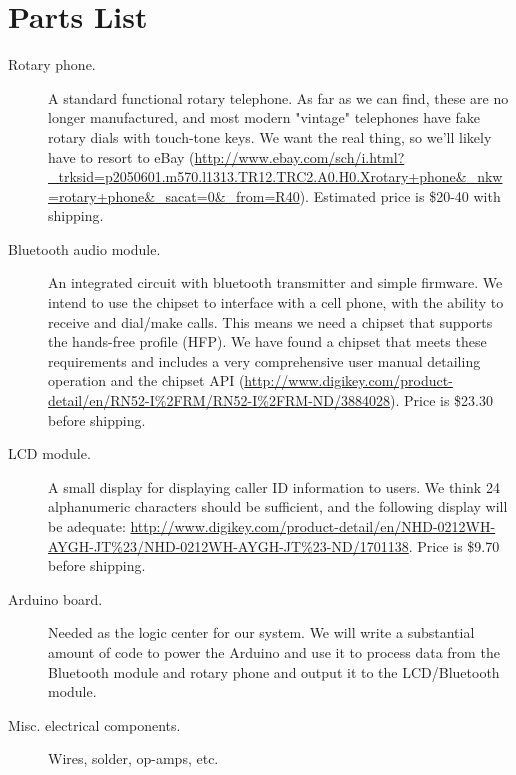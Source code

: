 \documentclass[11pt]{article}
\begin{document}
    \section{Parts List}
        \begin{description}
            \item[Rotary phone.] A standard functional rotary telephone. As far as we can find, these are no longer manufactured, and most modern "vintage" telephones have fake rotary dials with touch-tone keys. We want the real thing, so we'll likely have to resort to eBay (\url{http://www.ebay.com/sch/i.html?_trksid=p2050601.m570.l1313.TR12.TRC2.A0.H0.Xrotary+phone&_nkw=rotary+phone&_sacat=0&_from=R40}). Estimated price is \$20-40 with shipping.
            \item[Bluetooth audio module.] An integrated circuit with bluetooth transmitter and simple firmware. We intend to use the chipset to interface with a cell phone, with the ability to receive and dial/make calls. This means we need a chipset that supports the hands-free profile (HFP). We have found a chipset that meets these requirements and includes a very comprehensive user manual detailing operation and the chipset API (\url{http://www.digikey.com/product-detail/en/RN52-I%2FRM/RN52-I%2FRM-ND/3884028}). Price is \$23.30 before shipping.
            \item[LCD module.] A small display for displaying caller ID information to users. We think 24 alphanumeric characters should be sufficient, and the following display will be adequate: \url{http://www.digikey.com/product-detail/en/NHD-0212WH-AYGH-JT%23/NHD-0212WH-AYGH-JT%23-ND/1701138}. Price is \$9.70 before shipping.
            \item[Arduino board.] Needed as the logic center for our system. We will write a substantial amount of code to power the Arduino and use it to process data from the Bluetooth module and rotary phone and output it to the LCD/Bluetooth module.
            \item[Misc. electrical components.] Wires, solder, op-amps, etc.
        \end{description}
\end{document}
